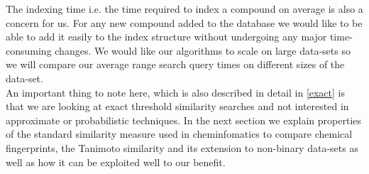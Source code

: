 The indexing time i.e. the time required to index a compound on average is also a concern for us. For any new compound added to the database we would like to be able to add it easily to the index structure without undergoing any major time-consuming changes. We would like our algorithms to scale on large data-sets so we will compare our average range search query times on different sizes of the data-set.\\

An important thing to note here, which is also described in detail in \autoref{exact} is that we are looking at exact threshold similarity searches and not interested in approximate or probabilistic techniques. In the next section we explain properties of the standard similarity measure used in cheminfomatics to compare chemical fingerprints, the Tanimoto similarity and its extension to non-binary data-sets as well as how it can be exploited well to our benefit. \\
